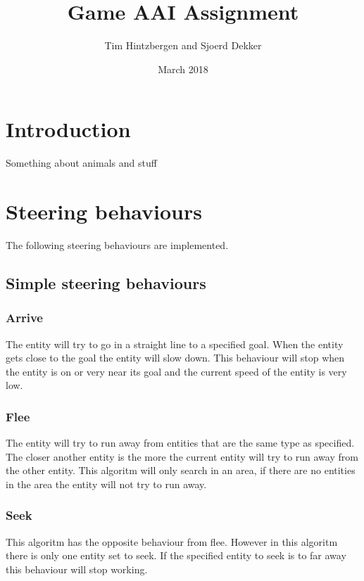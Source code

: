 \documentclass{article}
\title{Game AAI Assignment}
\author{Tim Hintzbergen and Sjoerd Dekker}
\date{March 2018}
\begin{document}
   \maketitle
   \newpage
   
   \tableofcontents{}
   \newpage
   \section {Introduction}
   Something about animals and stuff
   \newpage
   
   \section{Steering behaviours}
   The following steering behaviours are implemented. 
   \subsection{Simple steering behaviours}
   \subsubsection {Arrive}
   The entity will try to go in a straight line to a specified goal. When the entity gets close to the goal the entity will slow down. This behaviour will stop when the entity is on or very near its goal and the current speed of the entity is very low. 
   \subsubsection {Flee}
   The entity will try to run away from entities that are the same type as specified. The closer another entity is the more the current entity will try to run away from the other entity. This algoritm will only search in an area, if there are no entities in the area the entity will not try to run away.
   \subsubsection {Seek}
   This algoritm has the opposite behaviour from flee. However in this algoritm there is only one entity set to seek. If the specified entity to seek is to far away this behaviour will stop working.
\end{document}

